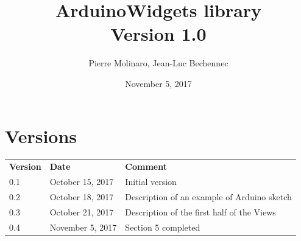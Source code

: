 \documentclass[a4paper,11pt]{extarticle}
\begin{document}
 


\title{\bf \Huge{ArduinoWidgets library\\Version 1.0}}
\author{Pierre Molinaro, Jean-Luc Bechennec}
\date {November 5, 2017}

\maketitle


\tableofcontents
\listoffigures


\section{Versions}
  \begin{tabular}{llp{10.5cm}}
    \textbf{Version} & \textbf{Date} & \textbf{Comment}\\
    0.1 & October 15, 2017 & Initial version \\
    0.2 & October 18, 2017 & Description of an example of Arduino sketch \\
    0.3 & October 21, 2017 & Description of the first half of the Views\\
    0.4 & November 5, 2017 & Section 5 completed


  \end{tabular}
\end{document}
